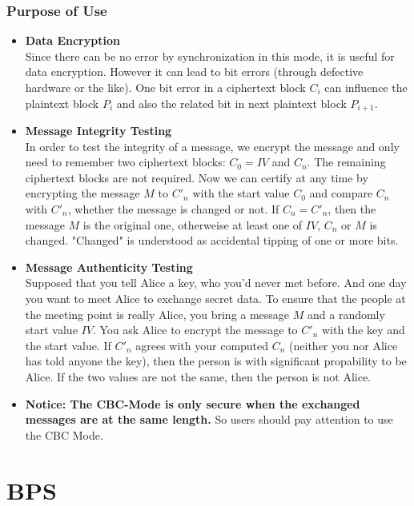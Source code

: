 \subsubsection*{Purpose of Use}
\begin{itemize}
\item \textbf{Data Encryption}\\ Since there can be no error by
  synchronization in this mode, it is useful for data
  encryption. However it can lead to bit errors (through defective
  hardware or the like). One bit error in a ciphertext block $C_i$ can
  influence the plaintext block $P_i$ and also the related bit in next
  plaintext block $P_{i+1}$.
\item \textbf{Message Integrity Testing}\\ In order to test the
  integrity of a message, we encrypt the message and only need to
  remember two ciphertext blocks: $C_0=IV$ and $C_n$. The remaining
  ciphertext blocks are not required. Now we can certify at any time
  by encrypting the message $M$ to $C'_n$ with the start value $C_0$
  and compare $C_n$ with $C'_n$, whether the message is changed or
  not. If $C_n=C'_n$, then the message $M$ is the original one,
  otherweise at least one of $IV$, $C_n$ or $M$ is changed. "Changed"
  is understood as accidental tipping of one or more bits.
\item \textbf{Message Authenticity Testing}\\ Supposed that you tell
  Alice a key, who you'd never met before. And one day you want to
  meet Alice to exchange secret data. To ensure that the people at the
  meeting point is really Alice, you bring a message $M$ and a
  randomly start value $IV$. You ask Alice to encrypt the message to
  $C'_n$ with the key and the start value. If $C'_n$ agrees with your
  computed $C_n$ (neither you nor Alice has told anyone the key), then
  the person is with significant propability to be Alice. If the two
  values are not the same, then the person is not Alice.
\item \textbf{Notice: The CBC-Mode is only secure when the exchanged
  messages are at the same length.} So users should pay attention to
  use the CBC Mode.
\end{itemize}


\section{BPS}
